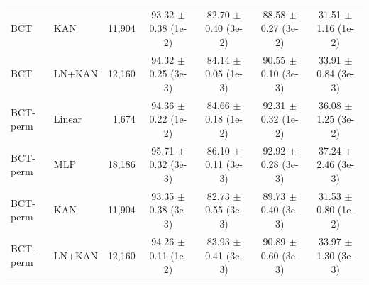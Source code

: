\documentclass[10pt]{article}
\begin{document}
\begin{longtable}{llrcccc}
BCT & KAN & 11,904 & 93.32 $\pm$ 0.38 (1e-2) & 82.70 $\pm$ 0.40 (3e-2) & 88.58 $\pm$ 0.27 (3e-2) & 31.51 $\pm$ 1.16 (1e-2) \\
BCT & LN+KAN & 12,160 & 94.32 $\pm$ 0.25 (3e-3) & 84.14 $\pm$ 0.05 (1e-3) & 90.55 $\pm$ 0.10 (3e-3) & 33.91 $\pm$ 0.84 (3e-3) \\
\midrule
BCT-perm & Linear & 1,674 & 94.36 $\pm$ 0.22 (1e-2) & 84.66 $\pm$ 0.18 (1e-2) & 92.31 $\pm$ 0.32 (1e-2) & 36.08 $\pm$ 1.25 (3e-2) \\
BCT-perm & MLP & 18,186 & 95.71 $\pm$ 0.32 (3e-3) & 86.10 $\pm$ 0.11 (3e-3) & 92.92 $\pm$ 0.28 (3e-3) & 37.24 $\pm$ 2.46 (3e-3) \\
BCT-perm & KAN & 11,904 & 93.35 $\pm$ 0.38 (3e-3) & 82.73 $\pm$ 0.55 (3e-3) & 89.73 $\pm$ 0.40 (3e-3) & 31.53 $\pm$ 0.80 (1e-2) \\
BCT-perm & LN+KAN & 12,160 & 94.26 $\pm$ 0.11 (1e-2) & 83.93 $\pm$ 0.41 (3e-3) & 90.89 $\pm$ 0.60 (3e-3) & 33.97 $\pm$ 1.30 (3e-3) \\
\end{longtable}
\normalsize
\end{document}
